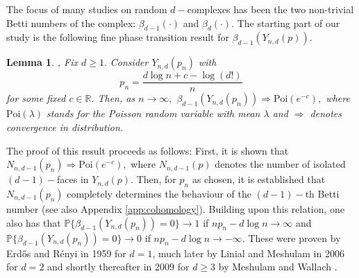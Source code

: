 \documentclass[12pt]{amsart}
\renewcommand{\Pr}{\mathbb{P}}
\newcommand{\Poi}{\text{Poi}}
\newcommand{\dy}[1]{\textcolor{magenta}{#1}}
\renewcommand{\dy}[1]{#1}
\newtheorem{lemma}[theorem]{Lemma}
\numberwithin{equation}{section}
\numberwithin{theorem}{section}
\newcommand{\1}{\mathbf{1}}
\def\bR{\mathbb{R}}
\begin{document}
The focus of many studies on random $d-$complexes has been the two non-trivial Betti numbers of the complex: $\beta_{d-1}(\cdot)$ and $\beta_d(\cdot)$. The starting part of our study is the following fine phase transition result for $\beta_{d-1}(Y_{n,d}(p))$.
%
\begin{lemma}
{\cite{stepanov1969combinatorial}, \cite[Theorem 1.10]{kahle2014inside}}
\label{lem:BettiNumber}
Fix $d \geq 1.$ Consider $Y_{n, d}(p_n)$ with
%
\begin{equation}
\label{eqn:pn}
%
p_n = \frac{d \log n + c - \log(d!)}{n}
%
\end{equation}
%
for some fixed $c \in \bR.$ Then, as $n \to \infty,$ $\beta_{d - 1}(Y_{n, d}(p_n)) \Rightarrow \Poi(e^{-c}),$ where $\Poi(\lambda)$ stands for the Poisson random variable with mean $\lambda$ and $\Rightarrow$ denotes convergence in distribution.
\end{lemma}
%
The proof of this result proceeds as follows: First, it is shown that $N_{n, d - 1}(p_n) \Rightarrow \Poi(e^{-c}),$ where $N_{n , d  - 1}(p)$ denotes the number of isolated $(d - 1)-$faces in $Y_{n, d}(p).$ Then, for $p_n$ as chosen, it is established that $N_{n, d - 1}(p_n)$ completely determines the behaviour of the $(d - 1)-$th Betti number \dy{(see also Appendix \ref{app:cohomology})}. Building upon this relation, one also has that $\Pr\{\beta_{d - 1}(Y_{n, d}(p_n)) = 0\} \to 1$ if $np_n - d\log n \to \infty$ and $\Pr\{\beta_{d - 1}(Y_{n, d}(p_n)) = 0\} \to 0$ if $np_n - d\log n \to -\infty.$ These were proven  by Erd\H{o}s and R\'{e}nyi \cite{Erdos59} in 1959 for $d=1$, much later by Linial and Meshulam  \cite{linial2006homological} in 2006 for $d=2$ and shortly thereafter in 2009 for $d \geq 3$ by Meshulam and Wallach \cite{meshulam2009homological}.
\end{document}
